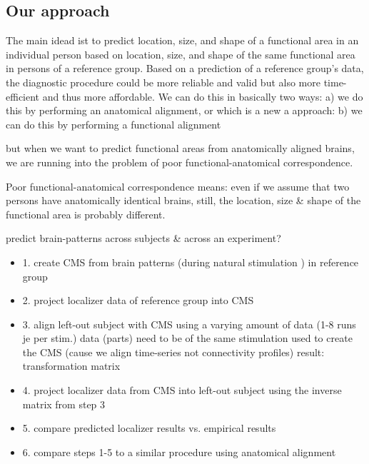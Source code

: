 \subsection{Our approach}
The main idead ist to predict location, size, and shape of a functional area in
an individual person based on location, size, and shape of the same functional
area in persons of a reference group.
%
Based on a prediction of a reference group's data, the diagnostic procedure
could be more reliable and valid but also more time-efficient and thus more
affordable.
%
We can do this in basically two ways:
a) we do this by performing an anatomical alignment, or
%
which is a new a approach:
%
b) we can do this by performing a functional alignment
%

but when we want to predict functional areas from anatomically aligned brains,
we are running into the problem of poor
functional-anatomical correspondence.

Poor functional-anatomical correspondence means:
even if we assume that two persons have anatomically identical brains, still,
the location, size \& shape of the functional area is probably different.


predict brain-patterns across subjects \& across an experiment?

\begin{itemize}
    \item 1. create CMS from brain patterns (during natural stimulation ) in
        reference group

    \item 2. project localizer data of reference group into CMS

    \item 3. align left-out subject with CMS using a varying amount of data (1-8
        runs je per stim.) data (parts) need to be of the same stimulation used
        to create the CMS (cause we align time-series not connectivity profiles)
        result: transformation matrix

    \item 4. project localizer data from CMS into left-out subject  using the
        inverse matrix from step 3

    \item 5. compare predicted localizer results vs. empirical results

    \item 6. compare steps 1-5 to a similar procedure using anatomical alignment

\end{itemize}

